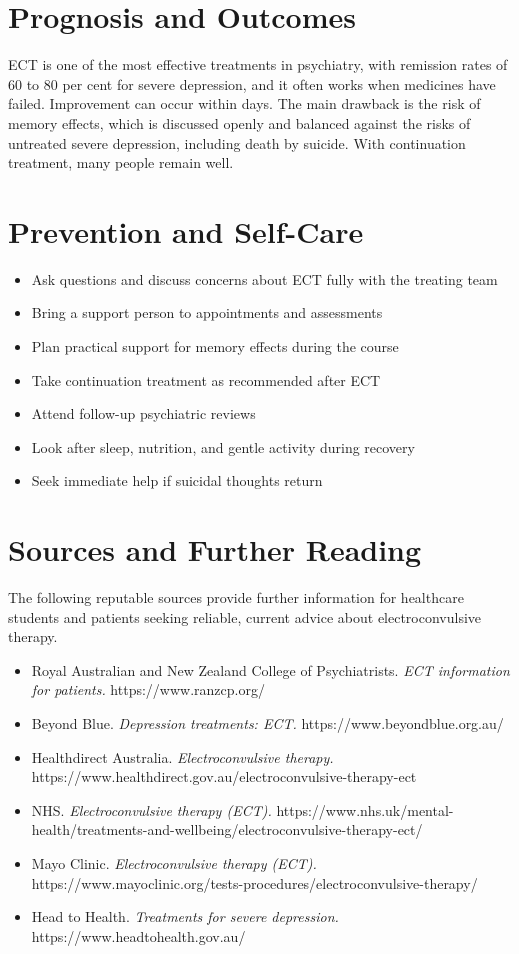 \section*{Prognosis and Outcomes}
ECT is one of the most effective treatments in psychiatry, with remission rates of 60 to 80 per cent for severe depression, and it often works when medicines have failed. Improvement can occur within days. The main drawback is the risk of memory effects, which is discussed openly and balanced against the risks of untreated severe depression, including death by suicide. With continuation treatment, many people remain well.

\section*{Prevention and Self-Care}
\begin{itemize}
    \item Ask questions and discuss concerns about ECT fully with the treating team
    \item Bring a support person to appointments and assessments
    \item Plan practical support for memory effects during the course
    \item Take continuation treatment as recommended after ECT
    \item Attend follow-up psychiatric reviews
    \item Look after sleep, nutrition, and gentle activity during recovery
    \item Seek immediate help if suicidal thoughts return
\end{itemize}

\section*{Sources and Further Reading}
The following reputable sources provide further information for healthcare students and patients seeking reliable, current advice about electroconvulsive therapy.
\begin{itemize}
    \item Royal Australian and New Zealand College of Psychiatrists. \textit{ECT information for patients.} https://www.ranzcp.org/
    \item Beyond Blue. \textit{Depression treatments: ECT.} https://www.beyondblue.org.au/
    \item Healthdirect Australia. \textit{Electroconvulsive therapy.} https://www.healthdirect.gov.au/electroconvulsive-therapy-ect
    \item NHS. \textit{Electroconvulsive therapy (ECT).} https://www.nhs.uk/mental-health/treatments-and-wellbeing/electroconvulsive-therapy-ect/
    \item Mayo Clinic. \textit{Electroconvulsive therapy (ECT).} https://www.mayoclinic.org/tests-procedures/electroconvulsive-therapy/
    \item Head to Health. \textit{Treatments for severe depression.} https://www.headtohealth.gov.au/
\end{itemize}

